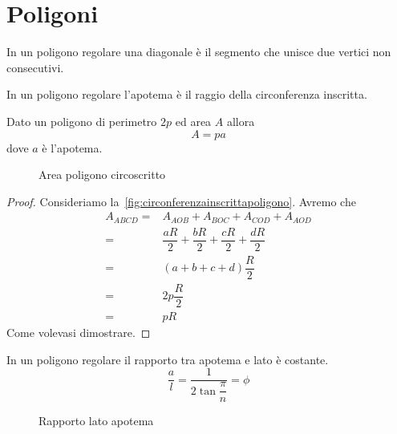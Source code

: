\chapter{Poligoni}\label{ch:poligoni}
\begin{defn}[Diagonali]\label{defn:poligonidiagonale}
In un poligono regolare una diagonale è il segmento che unisce due vertici non consecutivi.
\end{defn}
\begin{defn}[Apotema]\label{defn:poligoniapotema}
	In un poligono regolare l'apotema è il raggio della circonferenza inscritta.
\end{defn}
\begin{thm}\label{thm:areapoligonocircoscritto}
Dato un poligono di perimetro $2p$ ed area $A$ allora 
\[A=pa\]
dove $a$ è l'apotema.
\end{thm}
\begin{figure}
	\centering
	
	\caption{Area poligono circoscritto}
	\label{fig:circonferenzainscrittapoligono}
\end{figure}
\begin{proof}
Consideriamo la~\vref{fig:circonferenzainscrittapoligono}. Avremo che
\begin{align*}
	A_{ABCD}=&A_{AOB}+A_{BOC}+A_{COD}+A_{AOD}\\
	=&\dfrac{aR}{2}+\dfrac{bR}{2}+\dfrac{cR}{2}+\dfrac{dR}{2}\\
	=&(a+b+c+d)\dfrac{R}{2}\\
	=&2p\dfrac{R}{2}\\
	=&pR
\end{align*}
Come volevasi dimostrare.
\end{proof}
\begin{thm}\label{thm:rapportoapotemalato}
In un poligono regolare il rapporto tra apotema e lato è costante.
\[\dfrac{a}{l}=\dfrac{1}{2\tan{\dfrac{\pi}{n}}}=\phi\]
\end{thm}
\begin{figure}
	\centering
	
	\caption{Rapporto lato apotema}
	\label{fig:latoapotema}
\end{figure}
